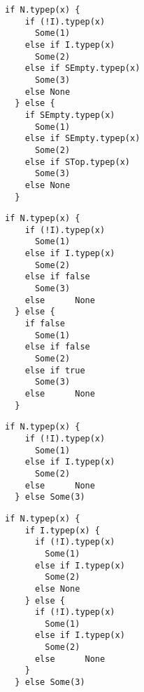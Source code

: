 \newsavebox\typecaseDbox
\begin{lrbox}{\typecaseDbox}
  \begin{minipage}{8cm}
\begin{lstlisting}[style=scalaioScala]
  if N.typep(x) {
    if (!I).typep(x)
      Some(1)
    else if I.typep(x)
      Some(2)
    else if SEmpty.typep(x)
      Some(3)
    else None
  } else {
    if SEmpty.typep(x)
      Some(1)
    else if SEmpty.typep(x)
      Some(2)
    else if STop.typep(x)
      Some(3)
    else None
  }
\end{lstlisting}
  \end{minipage}
\end{lrbox}

\newsavebox\typecaseEbox
\begin{lrbox}{\typecaseEbox}
  \begin{minipage}{8cm}
\begin{lstlisting}[style=scalaioScala]
  if N.typep(x) {
    if (!I).typep(x)
      Some(1)
    else if I.typep(x)
      Some(2)
    else if false
      Some(3)
    else      None
  } else {
    if false
      Some(1)
    else if false
      Some(2)
    else if true
      Some(3)
    else      None
  }
\end{lstlisting}
  \end{minipage}
\end{lrbox}

\newsavebox\typecaseFbox
\begin{lrbox}{\typecaseFbox}
  \begin{minipage}{8cm}
\begin{lstlisting}[style=scalaioScala]
  if N.typep(x) {
    if (!I).typep(x)
      Some(1)
    else if I.typep(x)
      Some(2)
    else      None
  } else Some(3)
\end{lstlisting}
  \end{minipage}
\end{lrbox}

\newsavebox\typecaseGbox
\begin{lrbox}{\typecaseGbox}
  \begin{minipage}{8cm}
\begin{lstlisting}[style=scalaioScala]
  if N.typep(x) {
    if I.typep(x) {
      if (!I).typep(x)
        Some(1)
      else if I.typep(x)
        Some(2)
      else None
    } else {
      if (!I).typep(x)
        Some(1)
      else if I.typep(x)
        Some(2)
      else      None
    }
  } else Some(3)
\end{lstlisting}
  \end{minipage}
\end{lrbox}

